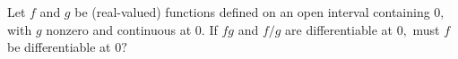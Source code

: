 Let $f$ and $g$ be (real-valued) functions defined on an open interval containing $0,$ with $g$ nonzero and continuous at $0.$ If $fg$ and $f/g$ are differentiable at $0,$ must $f$ be differentiable at $0?$